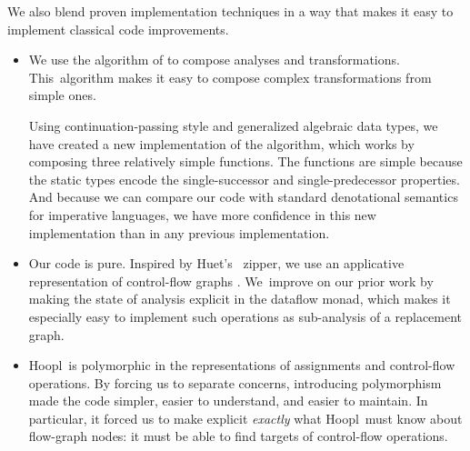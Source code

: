\documentclass[blockstyle,preprint,natbib,nocopyrightspace]{sigplanconf}
\newcommand\ourlib{Hoopl}  %
\let\cite\citep
\def\finalremark#1{\relax}
\newcommand\delendum[1]{\relax\ifvmode\else\unskip\fi\relax}
\begin{document}
We also blend proven implementation techniques
in a way that
makes it easy
to implement classical code improvements.
\begin{itemize}
\item
We use the algorithm of \citet{lerner-grove-chambers:2002} to 
compose analyses and transformations.
This~algorithm makes it easy to compose complex transformations
from simple ones.

Using continuation-passing style and generalized algebraic data types,
we have created a new implementation of the algorithm, 
which works by 
composing three relatively simple functions.
The functions are simple
because the static types encode the single-successor and
single-predecessor properties.
And because we can
compare our code with standard denotational semantics for imperative
languages, we have more confidence in this new implementation than in
any previous implementation. 
\item
Our code is pure.
Inspired by Huet's~\citeyearpar{huet:zipper} zipper,
we use an applicative representation of
control-flow graphs
\cite{ramsey-dias:applicative-flow-graph}. 
We~improve on our prior work by making the state of analysis
explicit in the dataflow monad,
which
makes it especially easy to implement such
operations as sub-analysis of a replacement graph. 
\delendum{This 
last sentence is a repeat of the previous one.}
%
%
\item
\ourlib\ is polymorphic in the
representations of 
assignments and control-flow operations.
%
By forcing us to separate concerns, introducing polymorphism
made the code simpler, easier to understand, and easier to maintain.
\finalremark
{SLPJ: Is it possible to substantiate this claim by [more] examples?}
In particular, it forced us to make explicit \emph{exactly} what
\ourlib\ 
 must know about flow-graph nodes:
it must be able to find
targets of control-flow operations.
\end{itemize}
\end{document}
